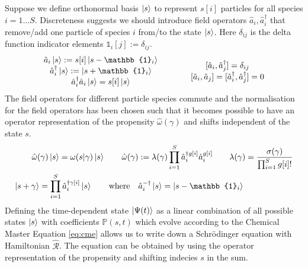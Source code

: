 \documentclass{article}[12pt]
\numberwithin{equation}{section}
\begin{document}
Suppose we define orthonormal basis $\ket{s}$ to represent $s[i]$ particles for
all species $i=1\dots S$. Discreteness suggests we should introduce field operators
$\hat{a}_i,\hat{a}_i^{\dagger}$ that remove/add one particle of species $i$ from/to the state
$\ket{s}$. Here $\delta_{ij}$ is the delta function indicator
elements $\mathbb{1}_i[j]:=\delta_{ij}$.
\begin{align}
	\begin{matrix}
		\hat{a}_i\ket{s}:=s[i]\ket{s-\mathbb{1}_i} \\
		\hat{a}_i^{\dagger}\ket{s}:=\ket{s+\mathbb{1}_i} \\
		\hat{a}_i^{\dagger}\hat{a}_i\ket{s}=s[i]\ket{s}
	\end{matrix}
	\qquad\qquad
	\begin{matrix}
		[\hat{a}_i,\hat{a}_j^{\dagger}]=\delta_{ij} \\
		[\hat{a}_i,\hat{a}_j]=[\hat{a}_i^{\dagger},\hat{a}_j^{\dagger}]=0
	\end{matrix}
	\label{eq:fieldoperators}
\end{align}
The field operators for different particle species commute and the normalisation
for the field operators has been chosen such that it becomes possible to have an
operator representation of the propensity $\hat\omega(\gamma)$ and shifts independent
of the state $s$.
\begin{align}
	\hat\omega(\gamma)\ket{s}=\omega(s|\gamma)\ket{s}
	\qquad
	\hat\omega(\gamma):=
	\lambda(\gamma)
	\prod_{i=1}^S
	\hat{a}_i^{\dagger g[i]}\hat{a}_i^{g[i]}
	\qquad
	\lambda(\gamma)=
	\frac{\sigma(\gamma)}{\prod_{i=1}^Sg[i]!}
	\\
	\ket{s+\gamma} =
	\prod_{i=1}^S\hat{a}_i^{\dagger\gamma[i]}
	\ket{s}\qquad
	\text{where}\quad
	\hat{a}_i^{-\dagger}\ket{s}=\ket{s-\mathbb{1}_i}
	\qquad\qquad\qquad
	\label{eq:propensityoperator}
\end{align}
Defining the time-dependent state $\ket{\Psi(t)}$ as a linear combination of all possible
states $\ket{s}$ with coefficients $\mathbb{P}(s,t)$ which evolve according to
the Chemical Master Equation \eqref{eq:cme} allows us to write down a Schr\"odinger
equation with Hamiltonian $\hat{\mathcal{R}}$. The equation can be obtained by using
the operator representation of the propensity and shifting indecies $s$ in the sum.
\end{document}
